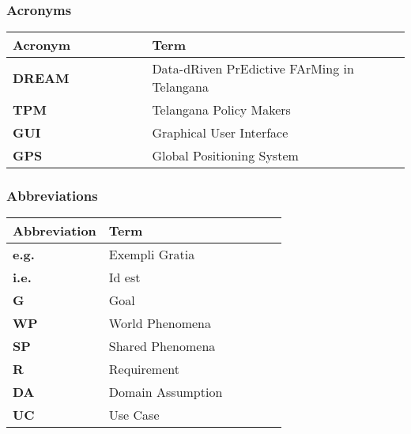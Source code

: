 \subsubsection{Acronyms}
\begin{center}
    \begin{tabular}{p{0.35\linewidth} p{0.65\linewidth}}
    \hline
        \textbf{Acronym} & \textbf{Term}\\
        \hline
        \textbf{DREAM} & Data-dRiven PrEdictive FArMing in Telangana\\
        \textbf{TPM} & Telangana Policy Makers\\
        \textbf{GUI} & Graphical User Interface\\
        \textbf{GPS} & Global Positioning System\\
    \hline
    \end{tabular}
\end{center}

\subsubsection{Abbreviations}
\begin{center}
    \begin{tabular}{p{0.35\linewidth} p{0.65\linewidth}}
    \hline
        \textbf{Abbreviation} & \textbf{Term}\\
    \hline
        \textbf{e.g.} & Exempli Gratia\\
        \textbf{i.e.} & Id est\\
        \textbf{G} & Goal\\
        \textbf{WP} & World Phenomena\\
        \textbf{SP} & Shared Phenomena\\
        \textbf{R} & Requirement\\
        \textbf{DA} & Domain Assumption\\
        \textbf{UC} & Use Case\\
    \hline
    \end{tabular}
\end{center}
\newpage

